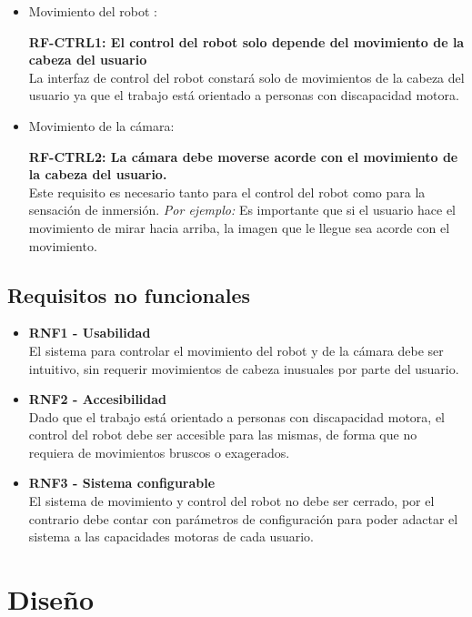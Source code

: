 \documentclass[twoside, 11pt]{epstfg}
\begin{document}
\begin{itemize}
	\item Movimiento del robot :
	
	\textbf{RF-CTRL1: El control del robot solo depende del movimiento de la cabeza del usuario}\\
	La interfaz de control del robot constará solo de movimientos de la cabeza del usuario ya que el trabajo está orientado a personas con discapacidad motora.
	\item  Movimiento de la cámara:

	\textbf{RF-CTRL2: La cámara debe moverse acorde con el movimiento de la cabeza del usuario.}\\
	Este requisito es necesario tanto para el control del robot como para la sensación de inmersión.
	\textit{Por ejemplo:} Es importante que si el usuario hace el movimiento de mirar hacia arriba, la imagen que le llegue sea acorde con el movimiento.
	
	
	
\end{itemize}


\section{Requisitos no funcionales}

\begin{itemize}
	\item \textbf{RNF1 - Usabilidad}\\
	El sistema para controlar el movimiento del robot y de la cámara debe ser intuitivo, sin requerir movimientos de cabeza inusuales por parte del usuario.
	
	
	
	\item \textbf{RNF2 - Accesibilidad}\\
	Dado que el trabajo está orientado a personas con discapacidad motora, el control del robot debe ser accesible para las mismas, de forma que no requiera de movimientos bruscos o exagerados. 
	
	\item \textbf{RNF3 - Sistema configurable}\\
	El sistema de movimiento y control del robot no debe ser cerrado, por el contrario debe contar con parámetros de configuración para poder adactar el sistema a las capacidades motoras de cada usuario.
\end{itemize}


\chapter{Diseño}
\end{document}
